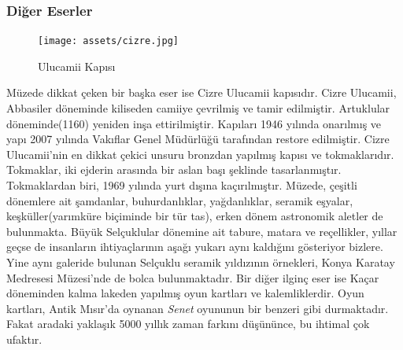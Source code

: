 \subsubsection{Diğer Eserler}
\begin{figure}
    \centering
    \texttt{[image: assets/cizre.jpg]}
    \caption{Ulucamii Kapısı}
\end{figure}
\indent\indent Müzede dikkat çeken bir başka eser ise Cizre Ulucamii kapısıdır. Cizre Ulucamii, Abbasiler döneminde kiliseden camiiye çevrilmiş ve tamir edilmiştir. Artuklular döneminde(1160) yeniden inşa ettirilmiştir. Kapıları 1946 yılında onarılmış ve yapı 2007 yılında Vakıflar Genel Müdürlüğü tarafından restore edilmiştir. Cizre Ulucamii'nin en dikkat çekici unsuru bronzdan yapılmış kapısı ve tokmaklarıdır. Tokmaklar, iki ejderin arasında bir aslan başı şeklinde tasarlanmıştır. Tokmaklardan biri, 1969 yılında yurt dışına kaçırılmıştır.\cite{dia_5}\newline
\indent Müzede, çeşitli dönemlere ait şamdanlar, buhurdanlıklar, yağdanlıklar, seramik eşyalar, keşküller(yarımküre biçiminde bir tür tas), erken dönem astronomik aletler de bulunmakta. Büyük Selçuklular dönemine ait tabure, matara ve reçellikler, yıllar geçse de insanların ihtiyaçlarının aşağı yukarı aynı kaldığını gösteriyor bizlere. Yine aynı galeride bulunan Selçuklu seramik yıldızının örnekleri, Konya Karatay Medresesi Müzesi'nde de bolca bulunmaktadır. Bir diğer ilginç eser ise Kaçar döneminden kalma lakeden yapılmış oyun kartları ve kalemliklerdir. Oyun kartları, Antik Mısır'da oynanan \textit{Senet} oyununun bir benzeri gibi durmaktadır. Fakat aradaki yaklaşık 5000 yıllık zaman farkını düşününce, bu ihtimal çok ufaktır.
\newpage
\clearpage
